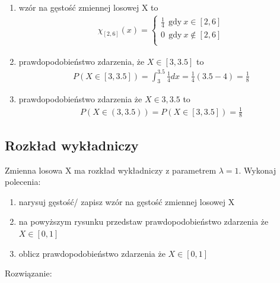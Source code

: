 \documentclass[12pt]{article}
\begin{document}
    \begin{enumerate}
        \item wzór na gęstość zmiennej losowej X to
        \begin{align*}
            \chi_{[2,6]}(x) = \left\{\begin{matrix}
                                         \frac{1}{4} ~~ \text{gdy} ~ x \in [2,6]  \\
                                         0 ~~ \text{gdy} ~ x \notin [2,6]  \\
            \end{matrix}\right.
        \end{align*}
        \item prawdopodobieństwo zdarzenia, że $X \in [3, 3.5]$ to
        \begin{align*}
            P(X \in [3, 3.5]) = \int_3^{3.5} \frac{1}{4} dx = \frac{1}{4} (3.5 - 4) = \frac{1}{8}
        \end{align*}
        \item prawdopodobieństwo zdarzenia że $X \in {3, 3.5}$ to
        \begin{align*}
            P(X \in (3, 3.5)) = P(X \in [3, 3.5]) = \frac{1}{8}
        \end{align*}
    \end{enumerate}

    \subsection{Rozkład wykładniczy}
    \begin{exercise}
        Zmienna losowa X ma rozkład wykładniczy z parametrem $\lambda = 1$. Wykonaj
        polecenia:
        \begin{enumerate}
            \item narysuj gęstość/ zapisz wzór na gęstość zmiennej losowej X
            \item na powyższym rysunku przedstaw prawdopodobieństwo zdarzenia że $X\in[0,1]$
            \item oblicz prawdopodobieństwo zdarzenia że $X \in [0,1]$
        \end{enumerate}
    \end{exercise}
    Rozwiązanie:\\
\end{document}
